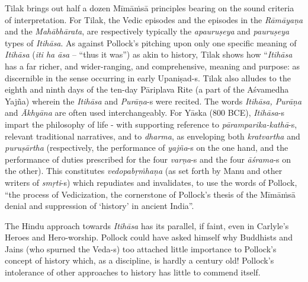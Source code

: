 Tilak brings out half a dozen Mīmāṁsā principles bearing on the sound criteria of interpretation. For Tilak, the Vedic episodes and the episodes in the \textit{Rāmāyaṇa} and the \textit{Mahābhārata}, are respectively typically the \textit{apauruṣeya} and \textit{pauruṣeya} types of \textit{Itihāsa}. As against Pollock’s pitching upon only one specific meaning of \textit{Itihāsa} (\textit{iti ha āsa} – ``thus it was'') as akin to history, Tilak shows how “\textit{Itihāsa} has a far richer, and wider-ranging, and comprehensive, meaning and purpose: as discernible in the sense occurring in early Upaniṣad-s. Tilak also alludes to the eighth and ninth days of the ten-day Pāriplava Rite (a part of the Aśvamedha Yajña) wherein the \textit{Itihāsa} and \textit{Purāṇa}-s were recited. The words \textit{Itihāsa, Purāṇa} and \textit{Ākhyāna} are often used interchangeably. For Yāska (800 BCE), \textit{Itihāsa}-s impart the philosophy of life - with supporting reference to \textit{pāramparika-kathā}-s, relevant traditional narratives, and to \textit{dharma}, as enveloping both \textit{kratvartha} and \textit{puruṣārtha} (respectively, the performance of \textit{yajña}-s on the one hand, and the performance of duties prescribed for the four \textit{varṇa}-s and the four \textit{āśrama}-s on the other). This constitutes \textit{vedopabṛṁhaṇa} (as set forth by Manu and other writers of \textit{smṛti}-s) which repudiates and invalidates, to use the words of Pollock, ``the process of Vedicization, the cornerstone of Pollock’s thesis of the Mīmāṁsā denial and suppression of ‘history’ in ancient India”. 

The Hindu approach towards \textit{Itihāsa} has its parallel, if faint, even in Carlyle’s Heroes and Hero-worship. Pollock could have asked himself why Buddhists and Jains (who spurned the Veda-s) too attached little importance to Pollock’s concept of history which, as a discipline, is hardly a century old! Pollock’s intolerance of other approaches to history has little to commend itself.

